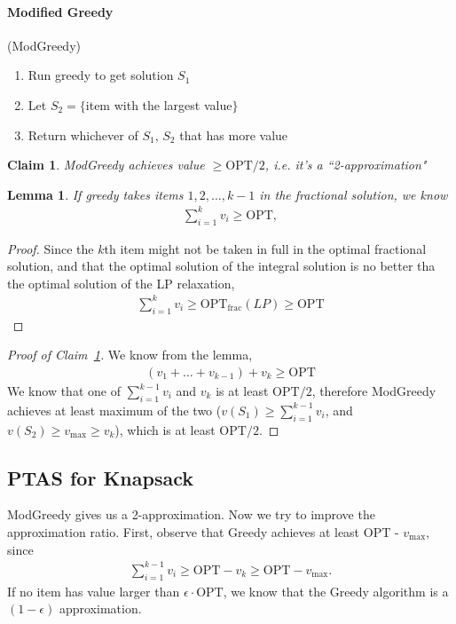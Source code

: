 \documentclass[11pt]{article}
\newcommand{\opt}{\mathrm{OPT}}
\newcommand{\fractional}{\mathrm{frac}}
\newtheorem{lemma}[theorem]{Lemma}
\newtheorem{claim}[theorem]{Claim}
\theoremstyle{definition}
\theoremstyle{remark}
\begin{document}
\paragraph{Modified Greedy} (ModGreedy)
\begin{enumerate}[1.]
	\item Run greedy to get solution $S_1$
	\item Let $S_2 = \{$item with the largest value$\}$
	\item Return whichever of $S_1$, $S_2$ that has more value
\end{enumerate}

\begin{claim} \label{clm:modGreedy2approx} ModGreedy achieves value $\geq \opt/2$, i.e. it's a ``2-approximation"
\end{claim}

\begin{lemma} If greedy takes items $1, 2, \dots, k-1$ in the fractional solution, we know 
\begin{align*}
	\sum_{i=1}^k v_i \geq \opt,
\end{align*}
\end{lemma}

\begin{proof} Since the  $k$th item might not be taken in full in the optimal fractional solution, and that 
%
the optimal solution of the integral solution is no better tha the optimal solution of the LP relaxation,
\begin{align*}
	\sum_{i = 1}^k v_i \geq \opt_{\fractional} (LP) \geq \opt
\end{align*}
\end{proof}

\begin{proof}[Proof of Claim~\ref{clm:modGreedy2approx}] We know from the lemma,
\begin{align*}
	(v_1 + \dots + v_{k-1}) + v_k \geq \opt
\end{align*}
We know that one of $\sum_{i=1}^{k-1} v_i $ and $v_{k}$ is at least $\opt/2$, therefore ModGreedy achieves at least maximum of the two ($v(S_1) \geq \sum_{i=1}^{k-1} v_i$, and $v(S_2) \geq v_{\max} \geq v_k$), which is at least $\opt/2$.
\end{proof}

\subsection{PTAS for Knapsack}

ModGreedy gives us a 2-approximation. Now we try to improve the approximation ratio. First, observe that Greedy achieves at least $\opt$  - $v_{\max}$, since
\begin{align*}
	\sum_{i=1}^{k-1} v_i  \geq \opt -  v_k \geq \opt - v_{\max}.
\end{align*}
%
If no item has value larger than $\epsilon \cdot \opt$, we know that the Greedy algorithm is a $(1-\epsilon)$ approximation.
\end{document}
